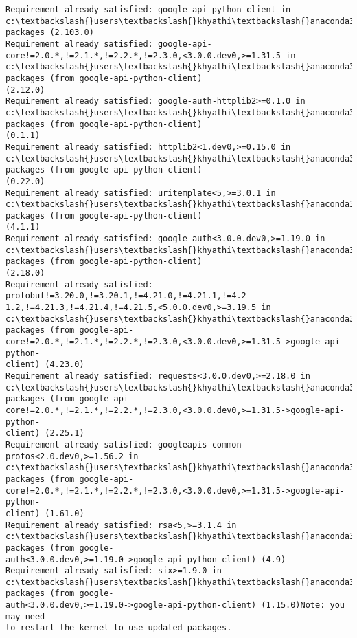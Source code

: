 \documentclass[11pt]{article}
\begin{document}
    \begin{Verbatim}[commandchars=\\\{\}]
Requirement already satisfied: google-api-python-client in
c:\textbackslash{}users\textbackslash{}khyathi\textbackslash{}anaconda3\textbackslash{}lib\textbackslash{}site-packages (2.103.0)
Requirement already satisfied: google-api-
core!=2.0.*,!=2.1.*,!=2.2.*,!=2.3.0,<3.0.0.dev0,>=1.31.5 in
c:\textbackslash{}users\textbackslash{}khyathi\textbackslash{}anaconda3\textbackslash{}lib\textbackslash{}site-packages (from google-api-python-client)
(2.12.0)
Requirement already satisfied: google-auth-httplib2>=0.1.0 in
c:\textbackslash{}users\textbackslash{}khyathi\textbackslash{}anaconda3\textbackslash{}lib\textbackslash{}site-packages (from google-api-python-client)
(0.1.1)
Requirement already satisfied: httplib2<1.dev0,>=0.15.0 in
c:\textbackslash{}users\textbackslash{}khyathi\textbackslash{}anaconda3\textbackslash{}lib\textbackslash{}site-packages (from google-api-python-client)
(0.22.0)
Requirement already satisfied: uritemplate<5,>=3.0.1 in
c:\textbackslash{}users\textbackslash{}khyathi\textbackslash{}anaconda3\textbackslash{}lib\textbackslash{}site-packages (from google-api-python-client)
(4.1.1)
Requirement already satisfied: google-auth<3.0.0.dev0,>=1.19.0 in
c:\textbackslash{}users\textbackslash{}khyathi\textbackslash{}anaconda3\textbackslash{}lib\textbackslash{}site-packages (from google-api-python-client)
(2.18.0)
Requirement already satisfied: protobuf!=3.20.0,!=3.20.1,!=4.21.0,!=4.21.1,!=4.2
1.2,!=4.21.3,!=4.21.4,!=4.21.5,<5.0.0.dev0,>=3.19.5 in
c:\textbackslash{}users\textbackslash{}khyathi\textbackslash{}anaconda3\textbackslash{}lib\textbackslash{}site-packages (from google-api-
core!=2.0.*,!=2.1.*,!=2.2.*,!=2.3.0,<3.0.0.dev0,>=1.31.5->google-api-python-
client) (4.23.0)
Requirement already satisfied: requests<3.0.0.dev0,>=2.18.0 in
c:\textbackslash{}users\textbackslash{}khyathi\textbackslash{}anaconda3\textbackslash{}lib\textbackslash{}site-packages (from google-api-
core!=2.0.*,!=2.1.*,!=2.2.*,!=2.3.0,<3.0.0.dev0,>=1.31.5->google-api-python-
client) (2.25.1)
Requirement already satisfied: googleapis-common-protos<2.0.dev0,>=1.56.2 in
c:\textbackslash{}users\textbackslash{}khyathi\textbackslash{}anaconda3\textbackslash{}lib\textbackslash{}site-packages (from google-api-
core!=2.0.*,!=2.1.*,!=2.2.*,!=2.3.0,<3.0.0.dev0,>=1.31.5->google-api-python-
client) (1.61.0)
Requirement already satisfied: rsa<5,>=3.1.4 in
c:\textbackslash{}users\textbackslash{}khyathi\textbackslash{}anaconda3\textbackslash{}lib\textbackslash{}site-packages (from google-
auth<3.0.0.dev0,>=1.19.0->google-api-python-client) (4.9)
Requirement already satisfied: six>=1.9.0 in
c:\textbackslash{}users\textbackslash{}khyathi\textbackslash{}anaconda3\textbackslash{}lib\textbackslash{}site-packages (from google-
auth<3.0.0.dev0,>=1.19.0->google-api-python-client) (1.15.0)Note: you may need
to restart the kernel to use updated packages.
    \end{Verbatim}
\end{document}

